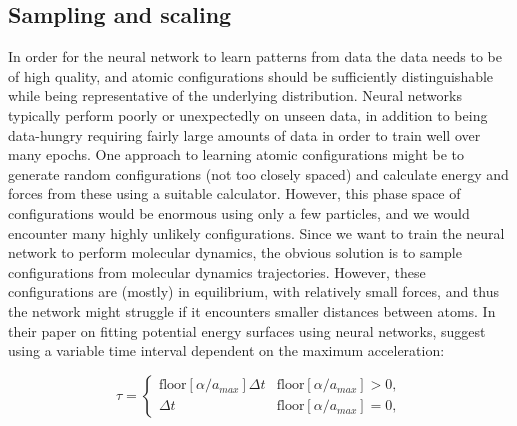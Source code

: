 \subsection{Sampling and scaling}
In order for the neural network to learn patterns from data
the data needs to be of high quality, and atomic configurations
should be sufficiently distinguishable while being representative
of the underlying distribution. Neural networks typically perform
poorly or unexpectedly on unseen data, in addition to being data-hungry
requiring fairly large amounts of data in order to train well
over many epochs.
One approach to learning atomic configurations might be to generate
random configurations (not too closely spaced) and calculate energy
and forces from these using a suitable calculator. However, this
phase space of configurations would be enormous using only a few particles,
and we would encounter many highly unlikely configurations.
Since we want to train the neural network to perform molecular dynamics,
the obvious solution is to sample configurations from molecular dynamics
trajectories. However, these configurations are (mostly) in equilibrium, with
relatively small forces, and thus the network might struggle if
it encounters smaller distances between atoms.
In their paper on fitting potential energy surfaces using neural networks,
\parencite[Pukrittayakamee et al.]{pukrittayakamee2009simultaneous}
suggest using a variable time interval dependent on the maximum acceleration:

\begin{equation}
    \tau = 
    \begin{cases}
        \text{floor}[\alpha / a_{max}]\Delta t & \text{floor}
        [\alpha / a_{max}] > 0, \\
        \Delta t & \text{floor}
        [\alpha / a_{max}] = 0,
    \end{cases}
\end{equation}

